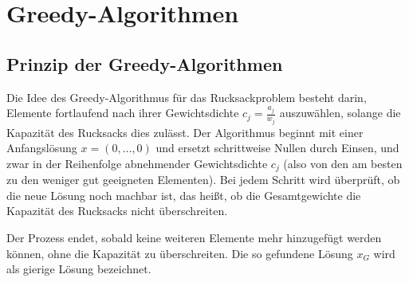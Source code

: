 \documentclass[12pt]{report}
\begin{document}

\chapter{Greedy-Algorithmen}



\section{Prinzip der Greedy-Algorithmen}
Die Idee des Greedy-Algorithmus für das Rucksackproblem besteht darin, Elemente fortlaufend nach ihrer Gewichtsdichte \( c_j = \frac{a_j}{w_j} \) auszuwählen, solange die Kapazität des Rucksacks dies zulässt. Der Algorithmus beginnt mit einer Anfangslösung \( x = (0, \ldots, 0) \) und ersetzt schrittweise Nullen durch Einsen, und zwar in der Reihenfolge abnehmender Gewichtsdichte \( c_j \) (also von den am besten zu den weniger gut geeigneten Elementen). Bei jedem Schritt wird überprüft, ob die neue Lösung noch machbar ist, das heißt, ob die Gesamtgewichte die Kapazität des Rucksacks nicht überschreiten.

Der Prozess endet, sobald keine weiteren Elemente mehr hinzugefügt werden können, ohne die Kapazität zu überschreiten. Die so gefundene Lösung \( x_G \) wird als gierige Lösung bezeichnet. \cite{diubin2003average}

\end{document}
